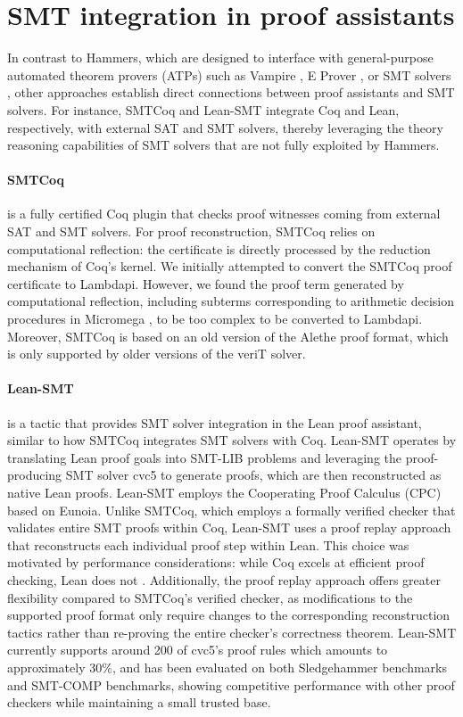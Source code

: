 \section{SMT integration in proof assistants}

In contrast to Hammers, which are designed to interface with general-purpose automated theorem provers (ATPs) such as Vampire \cite{vampire}, E Prover \cite{eprover}, or SMT solvers \cite{z3}, other approaches establish direct connections between proof assistants and SMT solvers.  
For instance, SMTCoq \cite{smtcoq} and Lean-SMT \cite{lean-smt} integrate Coq and Lean, respectively, with external SAT and SMT solvers, thereby leveraging the theory reasoning capabilities of SMT solvers that are not fully exploited by Hammers.

\paragraph{SMTCoq} is a fully certified Coq plugin that checks proof witnesses coming from external SAT and SMT solvers. For proof reconstruction, SMTCoq relies on computational reflection: the certificate is directly processed by the reduction mechanism of Coq's kernel.
We initially attempted to convert the SMTCoq proof certificate to Lambdapi. However, we found the proof term generated by computational reflection, including subterms corresponding to arithmetic decision procedures in Micromega \cite{micromega}, to be too complex to be converted to Lambdapi.
%
Moreover, SMTCoq is based on an old version of the Alethe proof format, which is only supported by older versions of the veriT solver.

\paragraph{Lean-SMT} is a tactic that provides SMT solver integration in the Lean proof assistant, similar to how SMTCoq integrates SMT solvers with Coq.
Lean-SMT operates by translating Lean proof goals into SMT-LIB problems and leveraging the proof-producing SMT solver cvc5 to generate proofs, which are then reconstructed as native Lean proofs.
Lean-SMT employs the Cooperating Proof Calculus (CPC) based on Eunoia.
Unlike SMTCoq, which employs a formally verified checker that validates entire SMT proofs within Coq, Lean-SMT uses a proof replay approach that reconstructs each individual proof step within Lean.
This choice was motivated by performance considerations: while Coq excels at efficient proof checking, Lean does not \cite{lean-perf}.
Additionally, the proof replay approach offers greater flexibility compared to SMTCoq's verified checker, as modifications to the supported proof format only require changes to the corresponding reconstruction tactics rather than re-proving the entire checker's correctness theorem.
Lean-SMT currently supports around 200 of cvc5's proof rules which amounts to approximately 30\%, and has been evaluated on both Sledgehammer benchmarks and SMT-COMP benchmarks, showing competitive performance with other proof checkers while maintaining a small trusted base.


